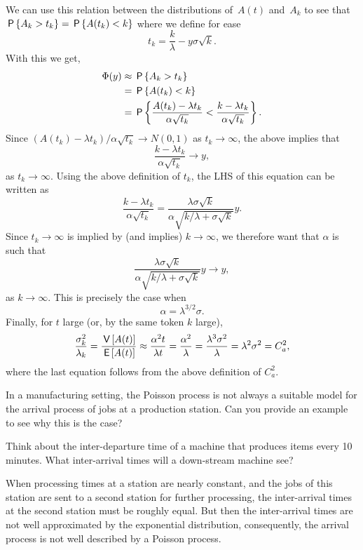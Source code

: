 We can use this relation between the distributions of~$A(t)$
and~$A_k$ to see that~$\P{A_k >t_k } = \P{A(t_k) <k}$ where
we define for ease
\begin{equation*}
t_k = \frac{k}\lambda - y \sigma \sqrt k.
\end{equation*}
With this we get,
\begin{align*}
\Phi(y)
 &\approx \P{A_k > t_k } \\
 &= \P{A(t_k) < k } \\
 &= \P{\frac{A(t_k) - \lambda t_k}{\alpha \sqrt{t_k}} <
\frac{k-\lambda t_k}{\alpha \sqrt{t_k}}}.
\end{align*}
Since $(A(t_k) - \lambda t_k)/ \alpha \sqrt{t_k} \to N(0,1)$
as $t_k \to \infty$, the above implies that
\begin{equation*}
\frac{k-\lambda t_k}{\alpha \sqrt{t_k}} \to y,
\end{equation*}
as $t_k \to \infty$. Using the above definition of $t_k$, the LHS
of this equation can be written as
\begin{equation*}
\frac{k-\lambda t_k}{\alpha \sqrt{t_k}} =
\frac{\lambda \sigma \sqrt k }{\alpha \sqrt{k/\lambda + \sigma\sqrt k}} y.
\end{equation*}
Since $t_k \to \infty$ is implied by (and implies)
$k\to\infty$, we therefore want that $\alpha$ is such that
\begin{equation*}
\frac{\lambda \sigma \sqrt k }{\alpha \sqrt{k/\lambda + \sigma\sqrt k}} y \to y,
\end{equation*}
as $k\to\infty$. This is precisely the case when
\begin{equation*}
\alpha = \lambda^{3/2}\sigma.
\end{equation*}
Finally, for $t$ large (or, by the same token $k$ large),
\begin{equation*}
\frac{\sigma_k^2}{\lambda_k} = \frac{\V{A(t)}}{\E{A(t)}} \approx \frac{\alpha^2 t}{\lambda t}
= \frac{\alpha^2}{\lambda} = \frac{\lambda^3\sigma^2}{\lambda} = \lambda^2 \sigma^2 = C_a^2,
\end{equation*}
where the last equation follows from the above definition of $C_a^2$.

\begin{exercise}
In a manufacturing setting, the Poisson process is not always a suitable model for the arrival process of jobs at a production station. Can you provide an example to see why this is the case?
\begin{hint}
Think about the inter-departure time of a machine that produces items every 10 minutes. What inter-arrival times will a down-stream machine see?

\end{hint}
\begin{solution}
  When processing times at a station are nearly constant, and the jobs of this station are sent to a second station for further processing, the inter-arrival times at the second station must be roughly equal.
  But then the inter-arrival times are not well approximated by the exponential distribution, consequently, the arrival process is not well described by a Poisson process.
\end{solution}
\end{exercise}


